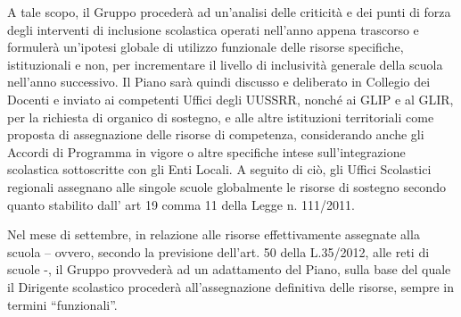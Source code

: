 \begin{enumerate}
\begin{itemize}
		A tale scopo, il Gruppo procederà ad un'analisi delle criticità e dei punti di forza degli
		interventi di inclusione scolastica operati nell'anno appena trascorso e formulerà
		un'ipotesi globale di utilizzo funzionale delle risorse specifiche, istituzionali e non, per
		incrementare il livello di inclusività generale della scuola nell'anno successivo. Il Piano
		sarà quindi discusso e deliberato in Collegio dei Docenti e inviato ai competenti Uffici
		degli UUSSRR, nonché ai GLIP e al GLIR, per la richiesta di organico di sostegno, e
		alle altre istituzioni territoriali come proposta di assegnazione delle risorse di
		competenza, considerando anche gli Accordi di Programma in vigore o altre specifiche
		intese sull'integrazione scolastica sottoscritte con gli Enti Locali. A seguito di ciò, gli
		Uffici Scolastici regionali assegnano alle singole scuole globalmente le risorse di
		sostegno secondo quanto stabilito dall’ art 19 comma 11 della Legge n. 111/2011.
		
		Nel mese di settembre, in relazione alle risorse effettivamente assegnate alla scuola –
		ovvero, secondo la previsione dell'art. 50 della L.35/2012, alle reti di scuole -, il Gruppo provvederà ad un adattamento del Piano, sulla base del quale il Dirigente scolastico
		procederà all'assegnazione definitiva delle risorse, sempre in termini “funzionali”.
		

\end{itemize}
\end{enumerate}
